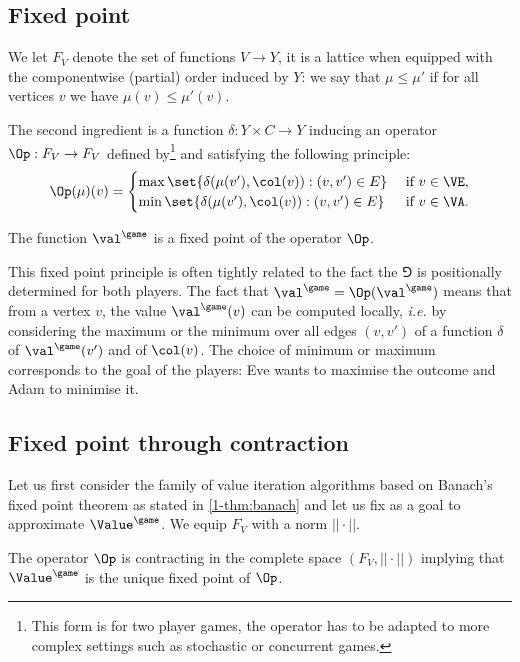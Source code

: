 \subsection*{Fixed point}
We let $F_V$ denote the set of functions $V \to Y$, it is a lattice when equipped with the componentwise (partial) order induced by $Y$:
we say that $\mu \le \mu'$ if for all vertices $v$ we have $\mu(v) \le \mu'(v)$.

The second ingredient is a function $\delta : Y \times C \to Y$ inducing an operator $\Op : F_V \to F_V$ defined by\footnote{This form is for two player games, the operator has to be adapted to more complex settings such as stochastic or concurrent games.} and satisfying the following principle:
\[
\Op(\mu)(v) = 
\begin{cases}
\max \set{\delta( \mu(v'), \col(v)) : (v,v') \in E} & \text{ if } v \in \VE, \\
\min \set{\delta( \mu(v'), \col(v)) : (v,v') \in E} & \text{ if } v \in \VA.
\end{cases}
\]

\begin{property}
\label{1-property:fixed_point}
The function $\val^{\game}$ is a fixed point of the operator $\Op$.
\end{property}
This fixed point principle is often tightly related to the fact the $\Game$ is positionally determined for both players.
The fact that $\val^{\game} = \Op(\val^{\game})$ means that from a vertex $v$, 
the value $\val^{\game}(v)$ can be computed locally, \textit{i.e.} by considering the maximum or the minimum over all edges $(v,v')$ 
of a function $\delta$ of $\val^{\game}(v')$ and of $\col(v)$.
The choice of minimum or maximum corresponds to the goal of the players: Eve wants to maximise the outcome and Adam to minimise it.

\subsection*{Fixed point through contraction}
Let us first consider the family of value iteration algorithms based on Banach's fixed point theorem as stated in \cref{1-thm:banach}
and let us fix as a goal to approximate $\Value^{\game}$.
We equip $F_V$ with a norm $||\cdot||$.

\begin{property}
\label{1-property:fixed_point_contraction}
The operator $\Op$ is contracting in the complete space $(F_V,||\cdot||)$ implying that $\Value^{\game}$ is the unique fixed point of $\Op$.
\end{property}

